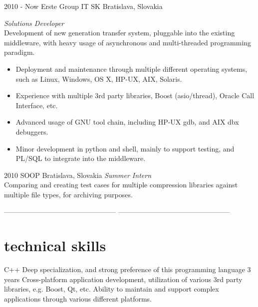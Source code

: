 \documentclass[]{friggeri-cv} %
\begin{document}
\begin{entrylist}
\entry
{2010 - Now}
{Erste Group IT SK}
{Bratislava, Slovakia}
{\emph{Solutions Developer} \\
Development of new generation transfer system, pluggable into the existing middleware, with heavy usage of asynchronous and multi-threaded programming paradigm.

\begin{itemize}
\item Deployment and maintenance through multiple different operating systems, such as Linux, Windows, OS X, HP-UX, AIX, Solaris.
\item Experience with multiple 3rd party libraries, Boost (asio/thread), Oracle Call Interface, etc. 
\item Advanced usage of GNU tool chain, including HP-UX gdb, and AIX dbx debuggers. 

\item Minor development in python and shell, mainly to support testing, and PL/SQL to integrate into the middleware.
\end{itemize}}

\entry
{2010}
{SOOP}
{Bratislava, Slovakia}
{\emph{Summer Intern} \\
Comparing and creating test cases for multiple compression libraries against multiple file types, for archiving purposes.}
\end{entrylist}


%
------------------------------------------------
------------------------------------------------


\section{technical skills}
\begin{entrylist}
\entry
{C++}
{Deep specialization, and strong preference of this programming language}
{3 years}
{Cross-platform application development, utilization of various 3rd party libraries, e.g. Boost, Qt, etc. Ability to maintain and support complex applications through various different platforms.}
\end{entrylist}
\end{document}
